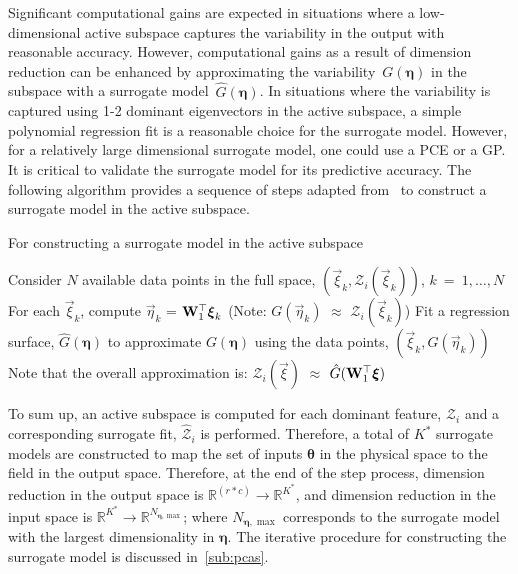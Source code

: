 Significant computational gains are expected in situations where a low-dimensional active subspace captures the
variability in the output with reasonable accuracy. However, computational gains as a result of dimension reduction
can be enhanced by approximating the variability~$G(\bm{\eta})$ in the subspace with a surrogate
model~$\hat{G}(\bm{\eta})$. In situations where the variability is captured using 1-2 dominant eigenvectors in
the active subspace, a simple polynomial regression fit is a reasonable choice for the surrogate model. 
However, for a relatively large dimensional surrogate model, one could
use a PCE or a GP. It is critical to validate the surrogate model for its predictive accuracy. 
The following algorithm provides a sequence of steps adapted from~\cite{Constantine:2015} to construct a
surrogate model in the active subspace.
%
\begin{breakablealgorithm}
\renewcommand{\algorithmicrequire}{\textbf{Input:}}
\renewcommand{\algorithmicensure}{\textbf{Output:}}
  \caption{For constructing a surrogate model in the active subspace}
  \begin{algorithmic}[1]
	  \State Consider $N$ available data points in the full space, $(\vec\xi_k,\mathcal{Z}_i(\vec\xi_k))$, $k~=~1,\ldots,N$
	  \State For each $\vec\xi_k$, compute $\vec\eta_k$ = $\mat{W}_1^\top\vec\xi_k$ 
          (Note: $G(\vec{\eta}_k)$ $\approx$ $\mathcal{Z}_i(\vec{\xi}_k)$)
	  \State Fit a regression surface, $\hat{G}(\bm{\eta})$ to approximate $G(\bm{\eta})$ using the data
                 points, $(\vec\xi_k,G(\vec\eta_k))$
	  \State Note that the overall approximation is: $\mathcal{Z}_i(\vec{\xi})$ $\approx$
                 $\hat{G}(\mat{W}_1^\top\vec{\xi})$ 
	\EndProcedure
  \end{algorithmic}
  \label{alg:surr}
\end{breakablealgorithm} 
%

\bigskip
To sum up, an active subspace is computed for each dominant feature, $\mathcal{Z}_i$ and a corresponding
surrogate fit, $\hat{\mathcal{Z}}_i$ is performed. Therefore, a total of $K^\ast$ surrogate models are constructed
to map the set of inputs $\bm{\theta}$ in the physical space to the field in the output space. 
Therefore, at the end of the step process, dimension reduction in the output space is 
$\mathbb{R}^{(r\ast c)}\rightarrow \mathbb{R}^{K^\ast}$, and dimension reduction in the input space
is $\mathbb{R}^{K^\ast}\rightarrow \mathbb{R}^{N_{\bm{\eta},\max}}$; 
where $N_{\bm{\eta},\max}$ corresponds to the surrogate model with the largest dimensionality in $\bm{\eta}$.
The iterative procedure for constructing the surrogate model is
discussed in~\ref{sub:pcas}.

